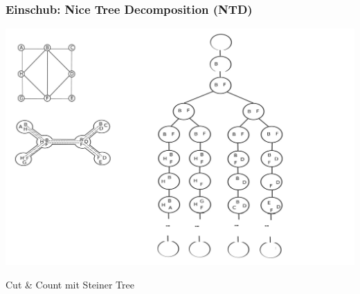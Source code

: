 \documentclass{beamer}
\begin{document}
\begin{frame}
\frametitle{Einschub: Nice Tree Decomposition (NTD)}

\begin{center}
\includegraphics[scale=0.17]{./imgs/tree_decomposition2.jpg}
\end{center}

\end{frame}


\begin{frame}
\Huge{\centerline{Cut \& Count mit Steiner Tree}}
\end{frame}
\end{document}
